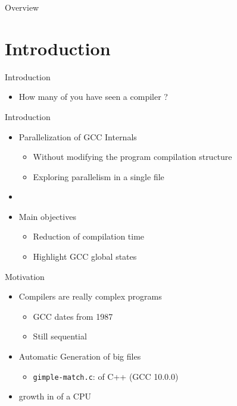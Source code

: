 \customtitlepage


\begin{frame}{Overview}
  \overview
\end{frame}

\section{Introduction}


\begin{frame}{Introduction}
    \begin{itemize}
        \item How many of you have seen a compiler {\color{blue}{running in parallel}}?
    \end{itemize}
\end{frame}

\begin{frame}{Introduction}
    \begin{itemize}
        \item Parallelization of GCC Internals
        \begin{itemize}
            \item Without modifying the program compilation structure
            \item Exploring parallelism in a single file
        \end{itemize}
        \item[]
        \item Main objectives
        \begin{itemize}
            \item Reduction of compilation time
            \item Highlight GCC global states
        \end{itemize}
    \end{itemize}
\end{frame}

\begin{frame}{Motivation}
  \begin{itemize}
    \item Compilers are really complex programs
        \begin{itemize}
            \item GCC dates from 1987
            \item Still sequential
        \end{itemize}
    \item Automatic Generation of big files
        \begin{itemize}
            \item \texttt{gimple-match.c}: {\color{red}{100358 lines}} of C++ (GCC 10.0.0)
        \end{itemize}
    \item {\color{red}{Exponencial}} growth in {\color{blue}{number of cores}} of a CPU
  \end{itemize}
\end{frame}

